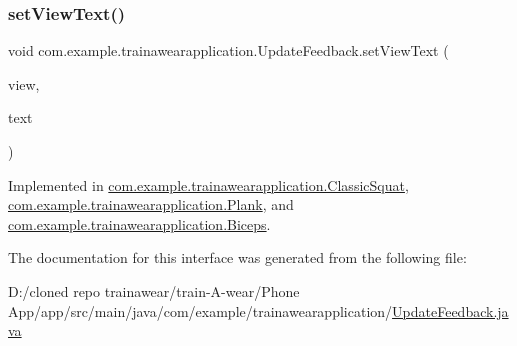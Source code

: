 \subsubsection{\texorpdfstring{setViewText()}{setViewText()}}
{\footnotesize\ttfamily void com.\+example.\+trainawearapplication.\+Update\+Feedback.\+set\+View\+Text (\begin{DoxyParamCaption}\item[{Text\+View}]{view,  }\item[{String}]{text }\end{DoxyParamCaption})}



Implemented in \mbox{\hyperlink{classcom_1_1example_1_1trainawearapplication_1_1_classic_squat_ab193e39e2f1255fd88d0508cfe7a63ff}{com.\+example.\+trainawearapplication.\+Classic\+Squat}}, \mbox{\hyperlink{classcom_1_1example_1_1trainawearapplication_1_1_plank_a4d4a46b71ced8fe89023ccbf14d17f77}{com.\+example.\+trainawearapplication.\+Plank}}, and \mbox{\hyperlink{classcom_1_1example_1_1trainawearapplication_1_1_biceps_a6e1ab1b99cd05b29fb7346b0642b7d0e}{com.\+example.\+trainawearapplication.\+Biceps}}.



The documentation for this interface was generated from the following file\+:\begin{DoxyCompactItemize}
\item 
D\+:/cloned repo trainawear/train-\/\+A-\/wear/\+Phone App/app/src/main/java/com/example/trainawearapplication/\mbox{\hyperlink{_update_feedback_8java}{Update\+Feedback.\+java}}\end{DoxyCompactItemize}
